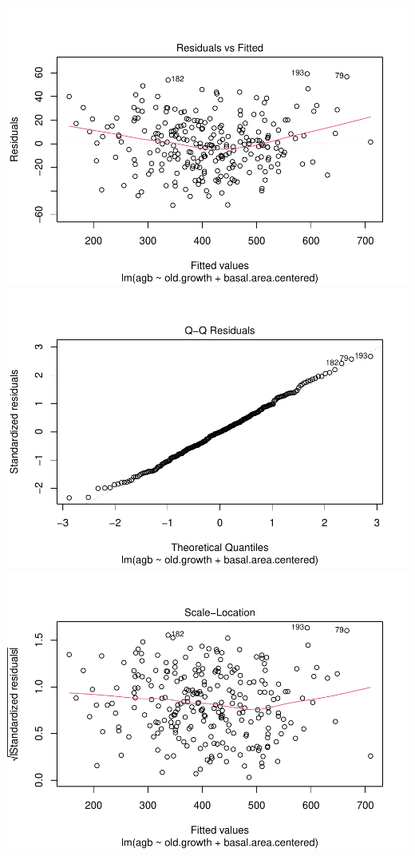 \documentclass[
]{article}
\begin{document}
\includegraphics{Stats-Lab-7_files/figure-latex/unnamed-chunk-11-1.pdf}
\includegraphics{Stats-Lab-7_files/figure-latex/unnamed-chunk-11-2.pdf}
\includegraphics{Stats-Lab-7_files/figure-latex/unnamed-chunk-11-3.pdf}
\end{document}
